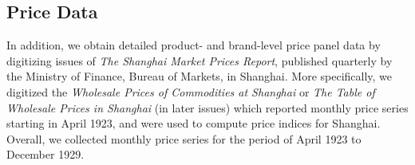 \documentclass[12pt]{article}
\begin{document}



\subsection{Price Data} \label{subsec:prices}


In addition, we obtain detailed product- and brand-level price panel data by digitizing  issues of \emph{The Shanghai Market Prices Report}, published quarterly by the Ministry of Finance, Bureau of Markets, in Shanghai. More specifically, we digitized the \emph{Wholesale Prices of Commodities at Shanghai} or \emph{The Table of Wholesale Prices in Shanghai} (in later issues) which  reported monthly price series starting in April 1923, and were used to compute price indices for Shanghai. Overall, we collected monthly price series for the period of April 1923 to December 1929.
\end{document}
